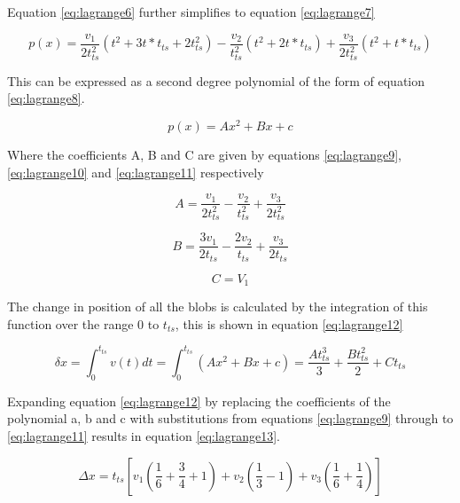 Equation \ref{eq:lagrange6} further simplifies to equation \ref{eq:lagrange7}

\begin{equation}
\label{eq:lagrange7}
p(x)=\frac{v_1}{2t_{ts}^2}(t^2+3t*t_{ts}+2t_{ts}^2)-\frac{v_2}{t_{ts}^2}(t^2+2t*t_{ts})+\frac{v_3}{2t_{ts}^2}(t^2+t*t_{ts})
\end{equation}

This can be expressed as a second degree polynomial of the form of equation \ref{eq:lagrange8}.

\begin{equation}
\label{eq:lagrange8}
p(x)=Ax^2+Bx+c
\end{equation}

Where the coefficients A, B and C are given by equations \ref{eq:lagrange9}, \ref{eq:lagrange10} and \ref{eq:lagrange11} respectively

\begin{equation}
\label{eq:lagrange9}
A=\frac{v_1}{2t_{ts}^2}-\frac{v_2}{t_{ts}^2}+\frac{v_3}{2t_{ts}^2}
\end{equation}

\begin{equation}
\label{eq:lagrange10}
B=\frac{3v_1}{2t_{ts}}-\frac{2v_2}{t_{ts}}+\frac{v_3}{2t_{ts}}
\end{equation}

\begin{equation}
\label{eq:lagrange11}
C=V_1
\end{equation}

The change in position of all the blobs is calculated by the integration of this function over the range 0 to $t_{ts}$, this is shown in equation \ref{eq:lagrange12}

\begin{equation}
\label{eq:lagrange12}
\delta x=\int_{0}^{t_{ts}} v(t)dt=\int_{0}^{t_{ts}} (Ax^2+Bx+c)=\frac{At_{ts}^3}{3}+\frac{Bt_{ts}^2}{2}+Ct_{ts}
\end{equation}

Expanding equation \ref{eq:lagrange12} by replacing the coefficients of the polynomial a, b and c with substitutions from equations \ref{eq:lagrange9} through to \ref{eq:lagrange11} results in equation \ref{eq:lagrange13}.

\begin{equation}
\label{eq:lagrange13}
\Delta x=t_{ts}\left[v_1(\frac{1}{6}+\frac{3}{4}+1)+v_2(\frac{1}{3}-1)+v_3(\frac{1}{6}+\frac{1}{4})\right]
\end{equation}

